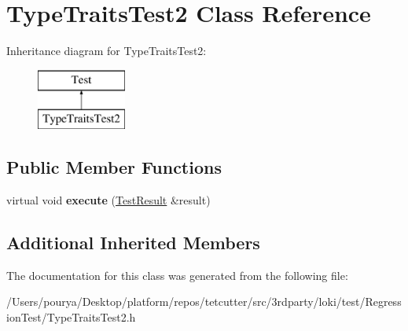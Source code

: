 \hypertarget{classTypeTraitsTest2}{}\section{Type\+Traits\+Test2 Class Reference}
\label{classTypeTraitsTest2}
Inheritance diagram for Type\+Traits\+Test2\+:\begin{figure}[H]
\begin{center}
\leavevmode
\includegraphics[height=2.000000cm]{classTypeTraitsTest2}
\end{center}
\end{figure}
\subsection*{Public Member Functions}
\begin{DoxyCompactItemize}
\item 
\hypertarget{classTypeTraitsTest2_aca736add5a608a4bd77ed28821dd6b13}{}virtual void {\bfseries execute} (\hyperlink{classTestResult}{Test\+Result} \&result)\label{classTypeTraitsTest2_aca736add5a608a4bd77ed28821dd6b13}

\end{DoxyCompactItemize}
\subsection*{Additional Inherited Members}


The documentation for this class was generated from the following file\+:\begin{DoxyCompactItemize}
\item 
/\+Users/pourya/\+Desktop/platform/repos/tetcutter/src/3rdparty/loki/test/\+Regression\+Test/Type\+Traits\+Test2.\+h\end{DoxyCompactItemize}
